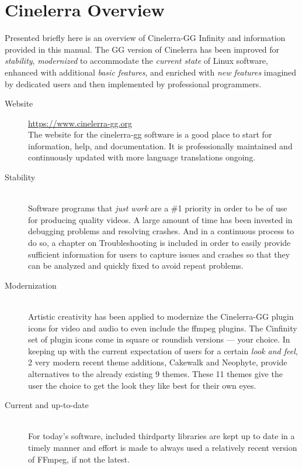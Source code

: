 \section*{Cinelerra Overview}%
\label{sec:cinelerra_overview}

Presented briefly here is an overview of Cinelerra-GG Infinity and information provided in this manual. 
The GG version of Cinelerra has been improved for \emph{stability}, \emph{modernized} to accommodate the
\emph{current state} of Linux software, enhanced with additional \emph{basic features}, and enriched with \emph{new features} imagined by dedicated users and then implemented by professional programmers.

\begin{description}
    \item[Website] \small \url{https://www.cinelerra-gg.org}\\
        The website for the cinelerra-gg software is a good place to start for information, help, and documentation. 
        It is professionally maintained and continuously updated with more language
        translations ongoing.
    \item[Stability] ~\\
        Software programs that \textit{just work} are a \#1 priority in order to be of use for producing quality videos.
        A large amount of time has been invested in debugging problems and resolving crashes. 
        And in a continuous process to do so, a chapter on Troubleshooting is included in order to easily provide sufficient information for users to capture issues and crashes so that they can be analyzed and quickly fixed to avoid repeat problems.
    \item[Modernization] ~\\
        Artistic creativity has been applied to modernize the Cinelerra-GG plugin icons for video and audio to even include the ffmpeg plugins. 
        The Cinfinity set of plugin icons come in square or roundish versions --- your choice. 
        In keeping up with the current expectation of users for a certain \textit{look and feel}, 2 very modern recent theme additions, Cakewalk and Neophyte, provide alternatives to the already existing 9 themes. 
        These 11 themes give the user the choice to get the look they like best for their own eyes.
    \item[Current and up-to-date] ~\\
        For today’s software, included thirdparty libraries are kept up to date in a timely manner and effort is made to always used a relatively recent version of FFmpeg, if not the latest. 

\end{description}
